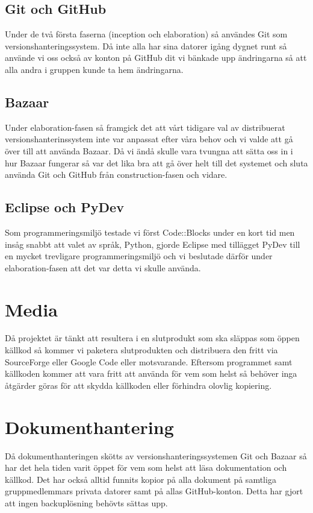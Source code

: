 \subsection{Git och GitHub}
Under de två första faserna (inception och elaboration) så användes Git som versionshanteringssystem. Då inte alla har sina datorer igång dygnet runt så använde vi oss också av konton på GitHub dit vi bänkade upp ändringarna så att alla andra i gruppen kunde ta hem ändringarna.

\subsection{Bazaar}
Under elaboration-fasen så framgick det att vårt tidigare val av distribuerat versionshanterinssystem inte var anpassat efter våra behov och vi valde att gå över till att använda Bazaar. Då vi ändå skulle vara tvungna att sätta oss in i hur Bazaar fungerar så var det lika bra att gå över helt till det systemet och sluta använda Git och GitHub från construction-fasen och vidare.

\subsection{Eclipse och PyDev}
Som programmeringsmiljö testade vi först Code::Blocks under en kort tid men insåg snabbt att valet av språk, Python, gjorde Eclipse med tillägget PyDev till en mycket trevligare programmeringsmiljö och vi beslutade därför under elaboration-fasen att det var detta vi skulle använda.

\section{Media}
Då projektet är tänkt att resultera i en slutprodukt som ska släppas som öppen källkod så kommer vi paketera slutprodukten och distribuera den fritt via SourceForge eller Google Code eller motsvarande. Eftersom programmet samt källkoden kommer att vara fritt att använda för vem som helst så behöver inga åtgärder göras för att skydda källkoden eller förhindra olovlig kopiering.

\section{Dokumenthantering}
Då dokumenthanteringen skötts av versionshanteringssystemen Git och Bazaar så har det hela tiden varit öppet för vem som helst att läsa dokumentation och källkod. Det har också alltid funnits kopior på alla dokument på samtliga gruppmedlemmars privata datorer samt på allas GitHub-konton. Detta har gjort att ingen backuplösning behövts sättas upp.

